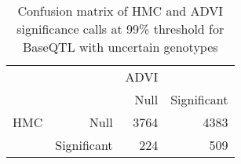 \begin{table}[ht]
\centering
\caption{Confusion matrix of HMC and ADVI significance calls at 99\% threshold for BaseQTL with uncertain genotypes} 
\label{tab:noGT-xtab-99}
\begin{tabular}{rr|rr}
   &  & ADVI &  \\ 
    &   & Null & Significant \\ 
   \hline
HMC & Null & 3764 & 4383 \\ 
    & Significant & 224 & 509 \\ 
  \end{tabular}
\end{table}

